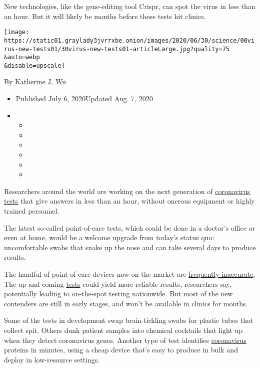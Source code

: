 New technologies, like the gene-editing tool Crispr, can spot the virus
in less than an hour. But it will likely be months before these tests
hit clinics.

\texttt{[image: https://static01.graylady3jvrrxbe.onion/images/2020/06/30/science/00virus-new-tests01/30virus-new-tests01-articleLarge.jpg?quality=75\\\&auto=webp\\\&disable=upscale]}

By
\href{https://www.nytimes3xbfgragh.onion/by/katherine-j--wu}{Katherine
J. Wu}

\begin{itemize}
\item
  Published July 6, 2020Updated Aug. 7, 2020
\item
  \begin{itemize}
  \item
  \item
  \item
  \item
  \item
  \item
  \end{itemize}
\end{itemize}

Researchers around the world are working on the next generation of
\href{https://www.nytimes3xbfgragh.onion/2020/08/07/us/covid-test-accuracy-governor-dewine-ohio.html}{coronavirus
tests} that give answers in less than an hour, without onerous equipment
or highly trained personnel.

The latest so-called point-of-care tests, which could be done in a
doctor's office or even at home, would be a welcome upgrade from today's
status quo: uncomfortable swabs that snake up the nose and can take
several days to produce results.

The handful of point-of-care devices now on the market are
\href{https://www.nytimes3xbfgragh.onion/2020/05/13/health/coronavirus-testing-white-house.html}{frequently
inaccurate}. The up-and-coming
\href{https://www.nytimes3xbfgragh.onion/2020/07/15/parenting/kids-covid-19-test.html}{tests}
could yield more reliable results, researchers say, potentially leading
to on-the-spot testing nationwide. But most of the new contenders are
still in early stages, and won't be available in clinics for months.

Some of the tests in development swap brain-tickling swabs for plastic
tubes that collect spit. Others dunk patient samples into chemical
cocktails that light up when they detect coronavirus genes. Another type
of test identifies
\href{https://www.nytimes3xbfgragh.onion/2020/07/15/parenting/kids-covid-19-test.html}{coronavirus}
proteins in minutes, using a cheap device that's easy to produce in bulk
and deploy in low-resource settings.

